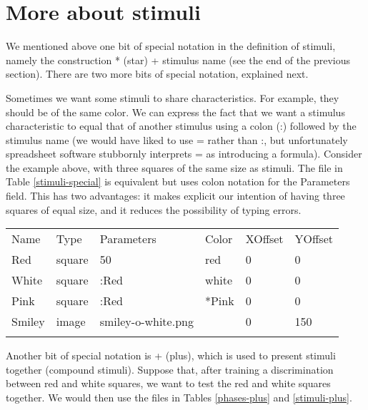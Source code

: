 \documentclass[11pt,]{article}
\renewcommand{\medskip}{}
\begin{document}
\section{More about stimuli}

We mentioned above one bit of special notation in the definition of
stimuli, namely the construction * (star) + stimulus name (see the end
of the previous section). There are two more bits of special notation,
explained next.

Sometimes we want some stimuli to share characteristics. For example,
they should be of the same color. We can express the fact that we want a
stimulus characteristic to equal that of another stimulus using a colon
(:) followed by the stimulus name (we would have liked to use = rather
than :, but unfortunately spreadsheet software stubbornly interprets =
as introducing a formula). Consider the example above, with three
squares of the same size as stimuli. The file in Table
\ref{stimuli-special} is equivalent but uses colon notation for the
Parameters field. This has two advantages: it makes explicit our
intention of having three squares of equal size, and it reduces the
possibility of typing errors.

\begin{table*}[t]\begin{center}\small\begin{tabular}{@{}llllll@{}}
\hline\noalign{\medskip}
Name & Type & Parameters & Color & XOffset & YOffset
\\\noalign{\medskip}
\hline\noalign{\medskip}
Red & square & 50 & red & 0 & 0
\\\noalign{\medskip}
White & square & :Red & white & 0 & 0
\\\noalign{\medskip}
Pink & square & :Red & *Pink & 0 & 0
\\\noalign{\medskip}
Smiley & image & smiley-o-white.png & & 0 & 150
\\\noalign{\medskip}
\hline
\noalign{\medskip}
\end{tabular}\caption{A \texttt{Stimuli.csv} file demonstrating the * and : special
notations for stimuli. \label{stimuli-special}}
\end{center}\end{table*}

Another bit of special notation is + (plus), which is used to present
stimuli together (compound stimuli). Suppose that, after training a
discrimination between red and white squares, we want to test the red
and white squares together. We would then use the files in Tables
\ref{phases-plus} and \ref{stimuli-plus}.
\end{document}
